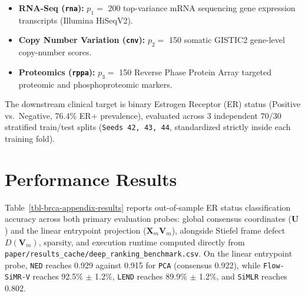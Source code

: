 \documentclass[
  10pt,
  letterpaper,
]{report}
\providecommand{\tightlist}{%
  \setlength{\itemsep}{0pt}\setlength{\parskip}{0pt}}
\begin{document}
\begin{itemize}
\tightlist
\item
  \textbf{RNA-Seq (\texttt{rna}):} \(p_1 =\) 200 top-variance mRNA
  sequencing gene expression transcripts (Illumina HiSeqV2).
\item
  \textbf{Copy Number Variation (\texttt{cnv}):} \(p_2 =\) 150 somatic
  GISTIC2 gene-level copy-number scores.
\item
  \textbf{Proteomics (\texttt{rppa}):} \(p_3 =\) 150 Reverse Phase
  Protein Array targeted proteomic and phosphoproteomic markers.
\end{itemize}

The downstream clinical target is binary Estrogen Receptor (ER) status
(Positive vs.~Negative, 76.4\% ER+ prevalence), evaluated across 3
independent \(70/30\) stratified train/test splits
(\texttt{Seeds\ 42,\ 43,\ 44}, standardized strictly inside each
training fold).

\section{Performance Results}\label{performance-results}

Table~\ref{tbl-brca-appendix-results} reports out-of-sample ER status
classification accuracy across both primary evaluation probes: global
consensus coordinates (\(\mathbf{U}\)) and the linear entrypoint
projection (\(\mathbf{X}_m \mathbf{V}_m\)), alongside Stiefel frame
defect \(D(\mathbf{V}_m)\), sparsity, and execution runtime computed
directly from
\texttt{paper/results\_cache/deep\_ranking\_benchmark.csv}. On the
linear entrypoint probe, \texttt{NED} reaches 0.929 against 0.915 for
\texttt{PCA} (consensus 0.922), while \texttt{Flow-SiMR-V} reaches
92.5\% \(\pm\) 1.2\%, \texttt{LEND} reaches 89.9\% \(\pm\) 1.2\%, and
\texttt{SiMLR} reaches 0.802.
\end{document}
